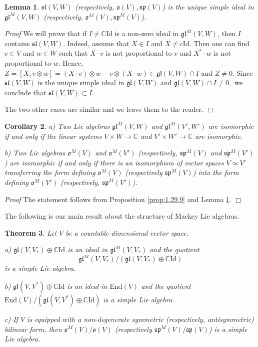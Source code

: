 \documentclass{svmult}
\newtheorem{theo}{Theorem}[section]
\newtheorem{lem}[theo]{Lemma}
\newtheorem{cor}[theo]{Corollary}
\renewenvironment{proof}{ \emph{Proof}}{$\Box$}
\newcommand {\CC} {\mathbb {C}}
\renewcommand{\sp}{\mathfrak{sp}}
\renewcommand{\sl}{\mathfrak{sl}}
\newcommand{\id}{\mathrm{Id}}
\newcommand{\oo}{\mathfrak{o}}
\newcommand{\gl}{\mathfrak{gl}}
\newcommand{\End}{\mathrm{End}}
\begin{document}
\begin{lem}\label{lem_nz} $\sl(V,W)$ (respectively, $\oo(V), \sp(V)$) is the unique simple ideal in  $\gl^M(V,W)$ (respectively, $\oo^M(V), \sp^M(V)$). 
\end{lem}

\begin{proof}
 We will prove that if $I\neq\CC\id$ is a non-zero ideal in $\gl^M(V,W)$, then $I$ contains  $\sl(V,W)$. Indeed, assume that $X\in I$ and $X\neq c\id$.
Then one can find $v\in V$ and $w\in W$ such that $X\cdot v$ is not proportional to $v$ and $X^*\cdot w$ is not proportional to $w$.
Hence, $Z=[X,v \otimes w]=(X\cdot v)\otimes w- v \otimes (X\cdot w)\in \gl(V,W) \cap I$ and $Z\neq 0$. Since $\sl(V,W)$ is the 
unique simple ideal in $\gl(V,W)$ and $\gl(V,W) \cap I\neq 0,$  we conclude that $\sl(V,W)\subset I$.

The two other cases are similar and we leave them to the reader.
\end{proof}

\begin{cor}\label{corr:14_10}
a) Two Lie algebras $\gl^M(V,W)$ and $\gl^M(V',W')$ are isomorphic if and only if the linear systems $V\times W\rightarrow \CC$ and 
$V' \times W' \rightarrow \CC$ are isomorphic.

b) Two Lie algebras $\oo^M(V)$ and $\oo^M(V')$ (respectively, $\sp^M(V)$ and $\sp^M(V')$) are isomorphic if and only if there is an isomorphism of vector spaces $V\simeq V'$ transferring the form defining $\oo^M(V)$ (respectively $\sp^M(V)$) into the form defining $\oo^M(V')$ (respectively, $\sp^M(V')$).
\end{cor}

\begin{proof}
 The statement follows from Proposition \ref{prop:1.29.9} and Lemma \ref{lem_nz}.
\end{proof}

\vspace{0.33cm}

The following is our main result about the structure of Mackey Lie algebras.

\begin{theo} \label{maintheo} Let $V$ be a countable-dimensional vector space. 

a) $\gl(V,V_*) \oplus \CC \id$ is an ideal in $\gl^M(V,V_*)$ and the 
quotient $$\gl^M(V,V_*)/\left(\gl(V,V_*)\oplus \CC \id\right)$$ 
is a simple Lie algebra.

b)  $\gl(V, V^*) \oplus \CC \id$ is an ideal in $\End(V)$ and the quotient
$\End(V)/\left(\gl(V, V^*) \oplus \CC \id\right)$ 
is a simple Lie algebra. 

c) If $V$ is equipped with a non-degenerate symmetric (respectively, antisymmetric) bilinear form, then $\oo^M(V)/\oo(V)$ (respectively $\sp^M(V)/\sp(V)$) 
is a simple Lie algebra.
\end{theo}
\end{document}
